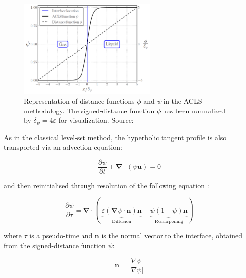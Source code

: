 \begin{figure}[ht]
    \centering
    \includegraphics[width=0.6\textwidth]{./part1_numerical_approaches/figures_ch2/ACLS_psi_phi_janodet_JCP}
       \centering
    \caption[Representation of distance functions $\phi$ and $\psi$ in the ACLS methodology]{Representation of distance functions $\phi$ and $\psi$ in the ACLS methodology. The signed-distance function $\phi$ has been normalized by $\delta_\psi = 4\varepsilon$ for visualization. Source: }
    \label{fig:psi_phi_profiles_janodet_2021_JCP}
\end{figure}


As in the classical level-set method, the hyperbolic tangent profile is also transported via an advection equation:

\begin{equation}
    \frac{\partial \psi}{\partial t} + \boldsymbol{\nabla} \cdot \left( \psi \textbf{u} \right) = 0
\end{equation}

and then reinitialised through resolution of the following equation :


\begin{equation}
\label{eq:acls_reinit_2008}
\frac{\partial\psi}{\partial \tau}=\boldsymbol{\nabla}\cdot(\ \underbrace{\varepsilon(\boldsymbol{\nabla}\psi\cdot\textbf{n})\textbf{n}}_{\mathrm{Diffusion}}-\underbrace{\psi(1-\psi)\textbf{n}}_{\mathrm{Resharpening}})
\end{equation}

where $\tau$ is a pseudo-time and $\textbf{n}$ is the normal vector to the interface, obtained from the signed-distance function $\psi$:

\begin{equation}
\textbf{n} = \frac{\nabla \psi}{| \nabla \psi |} 
\end{equation}


